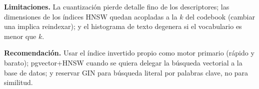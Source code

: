 \documentclass[conference]{IEEEtran}
\begin{document}
\textbf{Limitaciones.} La cuantización pierde detalle fino de los
descriptores; las dimensiones de los índices HNSW quedan acopladas a la $k$
del codebook (cambiar una implica reindexar); y el histograma de texto
degenera si el vocabulario es menor que $k$.

\textbf{Recomendación.} Usar el índice invertido propio como motor primario
(rápido y barato); pgvector+HNSW cuando se quiera delegar la búsqueda
vectorial a la base de datos; y reservar GIN para búsqueda literal por
palabras clave, no para similitud.
\end{document}
